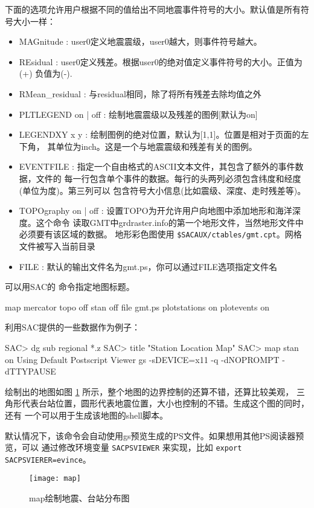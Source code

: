 下面的选项允许用户根据不同的值给出不同地震事件符号的大小。默认值是所有符号大小一样：
\begin{itemize}
\item MAGnitude : user0定义地震震级，user0越大，则事件符号越大。
\item REsidual : user0定义残差。根据user0的绝对值定义事件符号的大小。正值为(+) 负值为(-).
\item RMean\_residual : 与residual相同，除了将所有残差去除均值之外
\item PLTLEGEND on | off : 绘制地震震级以及残差的图例[默认为on]
\item LEGENDXY x y : 绘制图例的绝对位置，默认为[1,1]。位置是相对于页面的左下角，
    其单位为inch。这是一个与地震震级和残差有关的图例。
\item EVENTFILE : 指定一个自由格式的ASCII文本文件，其包含了额外的事件数据，文件的
    每一行包含单个事件的数据。每行的头两列必须包含纬度和经度(单位为度)。第三列可以
    包含符号大小信息(比如震级、深度、走时残差等)。
\item TOPOgraphy on | off : 设置TOPO为开允许用户向地图中添加地形和海洋深度。这个命令
    读取GMT中grdraster.info的第一个地形文件，当然地形文件中必须要有该区域的数据。
    地形彩色图使用 \verb|$SACAUX/ctables/gmt.cpt|。网格文件被写入当前目录
\item FILE : 默认的输出文件名为gmt.ps，你可以通过FILE选项指定文件名
\end{itemize}
可以用SAC的  命令指定地图标题。

\begin{SACDFT}
map mercator topo off stan off file gmt.ps plotstations on
    plotevents on
\end{SACDFT}

利用SAC提供的一些数据作为例子：
\begin{SACCode}
SAC> dg sub regional *.z
SAC> title "Station Location Map"
SAC> map stan on
Using Default Postscript Viewer
	gs -sDEVICE=x11 -q -dNOPROMPT -dTTYPAUSE
\end{SACCode}
绘制出的地图如图 \ref{fig:map} 所示，整个地图的边界控制的还算不错，还算比较美观，
三角形代表台站位置，圆形代表地震位置，大小也控制的不错。生成这个图的同时，还有
一个可以用于生成该地图的shell脚本。

默认情况下，该命令会自动使用gs预览生成的PS文件。如果想用其他PS阅读器预览，可以
通过修改环境变量 \texttt{SACPSVIEWER} 来实现，比如 \texttt{export SACPSVIERER=evince}。

\begin{figure}[!ht]
\centering
\texttt{[image: map]}
\caption{map绘制地震、台站分布图}
\label{fig:map}
\end{figure}

